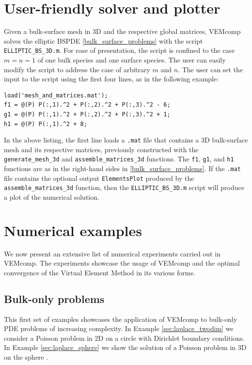 \documentclass[a4paper]{article}
\begin{document}
\section{User-friendly solver and plotter}
\label{sec:user_friendly_solver}
Given a bulk-surface mesh in 3D and the respective global matrices,  VEMcomp solves the elliptic BSPDE  \eqref{bulk_surface_problems} with the script \texttt{ELLIPTIC\_BS\_3D.m}.  For ease of presentation, the script is confined to the case $m=n=1$ of one bulk species and one surface species.  The user can easily modify the script to address the case of arbitrary $m$ and $n$.
The user can set the input to the script using the first four lines, as in the following example:
\begin{lstlisting}
load('mesh_and_matrices.mat');
f1 = @(P) P(:,1).^2 + P(:,2).^2 + P(:,3).^2 - 6;
g1 = @(P) P(:,1).^2 + P(:,2).^2 + P(:,3).^2 + 1;
h1 = @(P) P(:,1).^2 + 8;
\end{lstlisting}
In the above listing, the first line loads a \texttt{.mat} file that contains a 3D bulk-surface mesh and its respective matrices, previously constructed with the \texttt{generate\_mesh\_3d} and \texttt{assemble\_matrices\_3d} functions. The \texttt{f1}, \texttt{g1}, and \texttt{h1} functions are as in the right-hand sides in \eqref{bulk_surface_problems}. If the \texttt{.mat} file contains the optional output \texttt{ElementsPlot} produced by the \texttt{assemble\_matrices\_3d} function, then the \texttt{ELLIPTIC\_BS\_3D.m} script will produce a plot of the numerical solution.

\section{Numerical examples}
\label{sec:numerical_examples}
We now present an extensive list of numerical experiments carried out in VEMcomp. The experiments showcase the usage of VEMcomp and the optimal convergence of the Virtual Element Method in its various forms.


\subsection{Bulk-only problems}
This first set of examples showcases the application of VEMcomp to bulk-only PDE problems of increasing complexity. In Example \ref{sec:laplace_twodim} we consider a Poisson problem in 2D on a circle with Dirichlet boundary conditions. In Example \ref{sec:laplace_sphere} we show the solution of a Poisson problem in 3D on the sphere .
\end{document}
